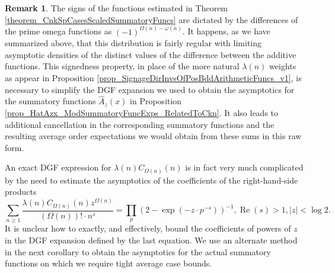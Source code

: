 \documentclass[11pt,reqno,a4letter]{article}
\numberwithin{figure}{section}
\numberwithin{table}{section}
\theoremstyle{plain}
\numberwithin{theorem}{section}
\theoremstyle{definition}
\newtheorem{remark}[theorem]{Remark}
\renewcommand{\Re}{\operatorname{Re}}
\begin{document}
\begin{remark}
The signs of the functions estimated in 
Theorem \ref{theorem_CnkSpCasesScaledSummatoryFuncs} are 
dictated by the differences of the prime omega functions as 
$(-1)^{\Omega(n) - \omega(n)}$. It happens, as we have summarized above, that 
this distribution is fairly regular with limiting asymptotic densities of the distinct values 
of the difference between the additive functions. This signedness property, in place of 
the more natural $\lambda(n)$ weights as appear in 
Proposition \ref{prop_SignageDirInvsOfPosBddArithmeticFuncs_v1}, is necessary to 
simplify the DGF expansion we used to obtain the asymptotics for the summatory 
functions $\widehat{A}_z(x)$ in 
Proposition \ref{prop_HatAzx_ModSummatoryFuncExps_RelatedToCkn}. It also leads to additional 
cancellation in the corresponding summatory functions and the resulting average order 
expectations we would obtain from these sums in this raw form. 

An exact DGF expression for 
$\lambda(n) C_{\Omega(n)}(n)$ is in fact very much complicated by the need to estimate the asymptotics 
of the coefficients of the right-hand-side products 
\[
\sum_{n \geq 1} \frac{\lambda(n) C_{\Omega(n)}(n) z^{\Omega(n)}}{(\Omega(n))! \cdot n^s} = 
     \prod_p \left(2 - \exp\left(-z \cdot p^{-s}\right)\right)^{-1}, 
     \Re(s) > 1, |z| < \log 2. 
\] 
It is unclear how to exactly, and effectively, bound the 
coefficients of powers of $z$ in the DGF expansion defined by the last equation. 
We use an alternate method in the next corollary to obtain the asymptotics for the actual 
summatory functions on which we require tight average case bounds. 
\end{remark} 
\end{document}
